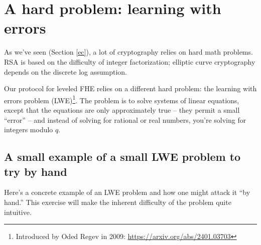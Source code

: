 \section{A hard problem: learning with errors}\label{lwe}

As we've seen (Section \ref{ec}), a lot of cryptography relies on hard math
problems. RSA is based on the difficulty of integer factorization;
elliptic curve cryptography depends on the discrete log assumption.

Our protocol for leveled FHE relies on a different hard problem: the
learning with errors problem (LWE)\footnote{Introduced by Oded Regev in 2009: \url{https://arxiv.org/abs/2401.03703}}.
The problem is to solve systems of
linear equations, except that the equations are only approximately true
-- they permit a small ``error'' -- and instead of solving for rational
or real numbers, you're solving for integers modulo $q$.

\subsection{A small example of a small LWE problem to try by hand}\label{lwe-small}

Here's a concrete example of an LWE problem and how one might attack it
``by hand.'' This exercise will make the inherent difficulty of the
problem quite intuitive.

